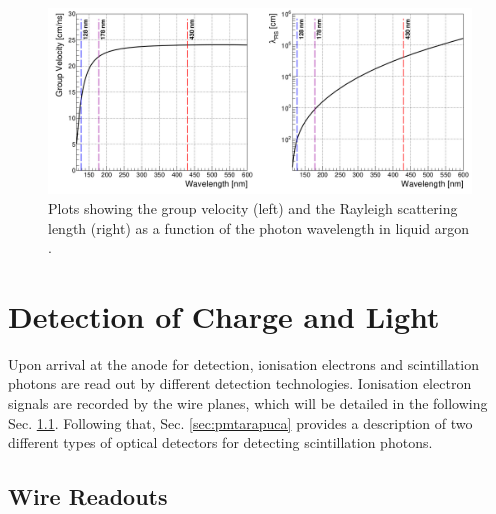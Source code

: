 \begin{figure}[ht!] 
\centering    
\includegraphics[width=1.0\textwidth]{vuv_visible}
\caption[vuv_visible]{
Plots showing the group velocity (left) and the Rayleigh scattering length (right) as a function of the photon wavelength in liquid argon \cite{PatrickPhD}.
}
\label{fig:vuv_visible}
\end{figure}

\section{Detection of Charge and Light}

\label{sec3:detection}

Upon arrival at the anode for detection, ionisation electrons and scintillation photons are read out by different detection technologies.
Ionisation electron signals are recorded by the wire planes, which will be detailed in the following Sec. \ref{sec:wire}.
Following that, Sec. \ref{sec:pmtarapuca} provides a description of two different types of optical detectors for detecting scintillation photons.

\subsection{Wire Readouts}
\label{sec:wire}

